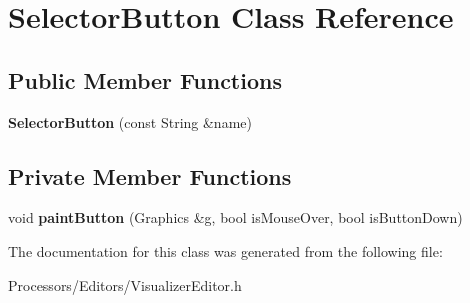 \hypertarget{classSelectorButton}{\section{Selector\-Button Class Reference}
\label{classSelectorButton}
}
\subsection*{Public Member Functions}
\begin{DoxyCompactItemize}
\item 
\hypertarget{classSelectorButton_af8deaf4c36313d154158c13ee7456a54}{{\bfseries Selector\-Button} (const String \&name)}\label{classSelectorButton_af8deaf4c36313d154158c13ee7456a54}

\end{DoxyCompactItemize}
\subsection*{Private Member Functions}
\begin{DoxyCompactItemize}
\item 
\hypertarget{classSelectorButton_aba5280fae570ab8f06c46b758967f470}{void {\bfseries paint\-Button} (Graphics \&g, bool is\-Mouse\-Over, bool is\-Button\-Down)}\label{classSelectorButton_aba5280fae570ab8f06c46b758967f470}

\end{DoxyCompactItemize}


The documentation for this class was generated from the following file\-:\begin{DoxyCompactItemize}
\item 
Processors/\-Editors/Visualizer\-Editor.\-h\end{DoxyCompactItemize}
